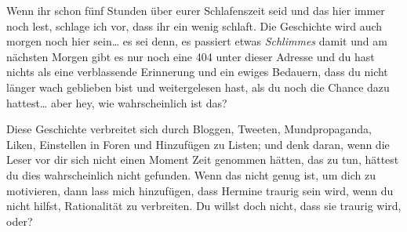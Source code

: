 \begin{chapterOpeningAuthorNote}
Wenn ihr schon fünf Stunden über eurer Schlafenszeit seid und das hier immer noch lest, schlage ich vor, dass ihr ein wenig schlaft. Die Geschichte wird auch morgen noch hier sein… es sei denn, es passiert etwas \emph{Schlimmes} damit und am nächsten Morgen gibt es nur noch eine 404 unter dieser Adresse und du hast nichts als eine verblassende Erinnerung und ein ewiges Bedauern, dass du nicht länger wach geblieben bist und weitergelesen hast, als du noch die Chance dazu hattest… aber hey, wie wahrscheinlich ist das?


Diese Geschichte verbreitet sich durch Bloggen, Tweeten, Mundpropaganda, Liken, Einstellen in Foren und Hinzufügen zu Listen; und denk daran, wenn die Leser vor dir sich nicht einen Moment Zeit genommen hätten, das zu tun, hättest du dies wahrscheinlich nicht gefunden. Wenn das nicht genug ist, um dich zu motivieren, dann lass mich hinzufügen, dass Hermine traurig sein wird, wenn du nicht hilfst, Rationalität zu verbreiten. Du willst doch nicht, dass sie traurig wird, oder?



\end{chapterOpeningAuthorNote}
